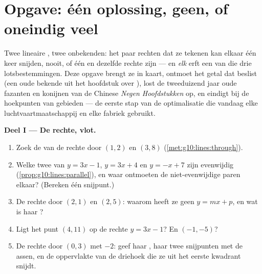 \section{Opgave: één oplossing, geen, of oneindig veel}

\begin{problem}
\label{pb:g10:lines:1}
Twee lineaire , twee onbekenden: het paar rechten dat ze
tekenen kan elkaar één keer snijden, nooit, of één en dezelfde rechte zijn ---
en \emph{elk}  erft een van die drie lotsbestemmingen. Deze
opgave brengt ze in kaart, ontmoet het getal dat beslist (een oude bekende
uit het hoofdstuk over ), lost de tweeduizend jaar oude fazanten en
konijnen van de Chinese \emph{Negen Hoofdstukken} op, en eindigt bij de
hoekpunten van gebieden --- de eerste stap van de optimalisatie die vandaag
elke luchtvaartmaatschappij en elke fabriek gebruikt.

\medskip
\noindent\textbf{Deel I --- De rechte, vlot.}
\begin{enumerate}
  \item Zoek de  van de rechte door $(1, 2)$ en
        $(3, 8)$ (\cref{met:g10:lines:through}).
  \item Welke twee van $y = 3x - 1$, $y = 3x + 4$ en $y = -x + 7$ zijn
        evenwijdig (\cref{prop:g10:lines:parallel}), en waar ontmoeten de
        niet-evenwijdige paren elkaar? (Bereken één snijpunt.)
  \item De rechte door $(2, 1)$ en $(2, 5)$: waarom heeft ze geen  $y = mx + p$, en wat is haar ?
  \item Ligt het punt $(4, 11)$ op de rechte $y = 3x - 1$? En $(-1, -5)$?
  \item De rechte door $(0, 3)$ met  $-2$: geef haar
        , haar twee snijpunten met de assen, en de oppervlakte van
        de driehoek die ze uit het eerste kwadrant snijdt.
\end{enumerate}


\end{problem}

